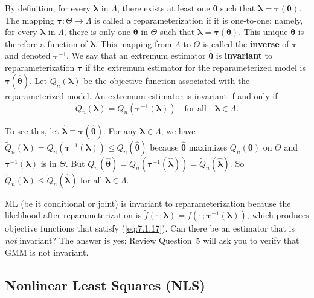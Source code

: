 By definition, for every $\bm{\lambda}$ in $\Lambda$, there exists at least one $\bm{\theta}$ such that $\bm{\lambda} = \bm{\tau}(\bm{\theta})$. The mapping $\bm{\tau} : \Theta \to \Lambda$ is called a reparameterization if it is one-to-one; namely, for every $\bm{\lambda}$ in $\Lambda$, there is only one $\bm{\theta}$ in $\Theta$ such that $\bm{\lambda} = \bm{\tau}(\bm{\theta})$. This unique $\bm{\theta}$ is therefore a function of $\bm{\lambda}$. This mapping from $\Lambda$ to $\Theta$ is called the \textbf{inverse} of $\bm{\tau}$ and denoted $\bm{\tau}^{-1}$. We say that an extremum estimator $\hat{\bm{\theta}}$ is \textbf{invariant} to reparameterization $\bm{\tau}$ if the extremum estimator for the reparameterized model is $\bm{\tau}(\hat{\bm{\theta}})$. Let $\widetilde{Q}_n(\bm{\lambda})$ be the objective function associated with the reparameterized model. An extremum estimator is invariant if and only if
\begin{equation}
\label{eq:7.1.17}
\widetilde{Q}_n(\bm{\lambda}) = Q_n(\bm{\tau}^{-1}(\bm{\lambda})) \quad \text{for all} \quad \bm{\lambda} \in \Lambda.
\end{equation}

To see this, let $\hat{\bm{\lambda}} \equiv \bm{\tau}(\hat{\bm{\theta}})$. For any $\bm{\lambda} \in \Lambda$, we have $\widetilde{Q}_n(\bm{\lambda}) = Q_n(\bm{\tau}^{-1}(\bm{\lambda})) \leq Q_n(\hat{\bm{\theta}})$ because $\hat{\bm{\theta}}$ maximizes $Q_n(\bm{\theta})$ on $\Theta$ and $\bm{\tau}^{-1}(\bm{\lambda})$ is in $\Theta$. But $Q_n(\hat{\bm{\theta}}) = Q_n(\bm{\tau}^{-1}(\hat{\bm{\lambda}})) = \widetilde{Q}_n(\hat{\bm{\lambda}})$. So $\widetilde{Q}_n(\bm{\lambda}) \leq \widetilde{Q}_n(\hat{\bm{\lambda}})$ for all $\bm{\lambda} \in \Lambda$.

ML (be it conditional or joint) is invariant to reparameterization because the likelihood after reparameterization is $\tilde{f}(\cdot\,; \bm{\lambda}) = f(\cdot\,; \bm{\tau}^{-1}(\bm{\lambda}))$, which produces objective functions that satisfy (\ref{eq:7.1.17}). Can there be an estimator that is \emph{not} invariant? The answer is yes; Review Question~5 will ask you to verify that GMM is not invariant.

\subsection*{Nonlinear Least Squares (NLS)}

